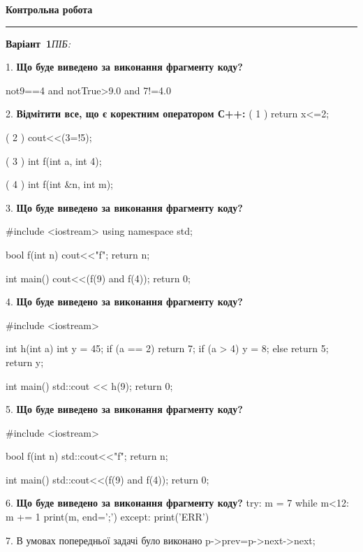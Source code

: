 \documentclass[11pt]{article}
\begin{document}
{\centering\Large\bfseries Контрольна робота\par}
\medskip
\noindent\rule{\linewidth}{0.5pt}
\smallskip
\noindent\textbf{Варіант \No\,1}\hfill \textit{ПІБ:}\,\underline{\hspace{60mm}}
\vspace{4mm}

1. \textbf{Що буде виведено за виконання фрагменту коду?}

not9==4 and notTrue>9.0 and 7!=4.0
\par\vspace{5mm}
2. %
\textbf{Відмітити все, що є коректним оператором С++:}
( 1 ) return x<=2;

( 2 ) cout<<(3=!5);

( 3 ) int f(int a, int 4);

( 4 ) int f(int &n, int m);
\par\vspace{5mm}
3. \textbf{Що буде виведено за виконання фрагменту коду?}

#include <iostream>
using namespace std;

bool f(int n){
    cout<<"f";
    return n;
}

int main(){
    cout<<(f(9) and f(4));
    return 0;
}
\par\vspace{5mm}
4. \textbf{Що буде виведено за виконання фрагменту коду?}

#include <iostream>

int h(int a){
    int y = 45;
    if (a == 2) 
        return 7;
    if (a > 4)
         y = 8;
    else
         return 5;
    return y;
}

int main(){
    std::cout << h(9);
    return 0;
}

\par\vspace{5mm}
5. \textbf{Що буде виведено за виконання фрагменту коду?}

#include <iostream>

bool f(int n){
    std::cout<<"f";
    return n;
}

int main(){
    std::cout<<(f(9) and f(4));
    return 0;
}
\par\vspace{5mm}
6. \textbf{Що буде виведено за виконання фрагменту коду?}
try:
    m = 7
    while m<12:
        m += 1
    print(m, end=';')
except:
    print('ERR')
\par\vspace{5mm}
7. 
В умовах попередньої задачі було виконано p->prev=p->next->next;
\end{document}
